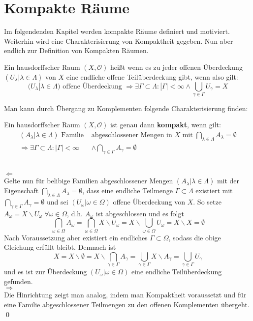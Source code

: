 \chapter{Kompakte Räume}
Im folgendenden Kapitel werden kompakte Räume definiert und motiviert. Weiterhin wird eine Charakterisierung von Kompaktheit gegeben.
Nun aber endlich zur Definition von Kompakten Räumen.

\begin{Def}[Kompaktheit]
	Ein hausdorffscher Raum \((X, \mathcal{O})\) heißt  wenn es zu jeder offenen Überdeckung 
	\((U_{\lambda} | \lambda \in \Lambda)\) von \(X\) eine endliche offene Teilüberdeckung gibt, wenn also gilt:
	\[ (U_{\lambda} | \lambda \in \Lambda) \mbox{ offene Überdeckung }
     \Rightarrow \exists \Gamma \subset \Lambda : |\Gamma| < \infty \land \bigcup_{\gamma \in \Gamma} U_{\gamma} = X \] 
\end{Def}
Man kann durch Übergang zu Komplementen folgende Charakterisierung finden:

\begin{Satz}
	Ein hausdorffscher Raum \((X, \mathcal{O})\) ist genau dann \textbf{kompakt}, wenn gilt:
	\begin{align*}
		(A_{\lambda}| \lambda \in \Lambda) \mbox{ Familie } & \mbox{abgeschlossener Mengen in } X \mbox{ mit } 
		\bigcap_{\lambda \in \Lambda} A_{\lambda} = \emptyset \\
		\Rightarrow \exists \Gamma \subset \Lambda : |\Gamma| < \infty & \land \bigcap_{\gamma \in \Gamma} A_{\gamma} = \emptyset
	\end{align*} 
\end{Satz}
	\\
	\glqq\(\Leftarrow\)\grqq
	\\
	Gelte nun für belibige Familien abgeschlossener Mengen \((A_{\lambda}| \lambda \in \Lambda)\) mit der Eigenschaft
	\(\bigcap_{\lambda \in \Lambda} A_{\lambda} = \emptyset\), dass eine endliche Teilmenge \(\Gamma \subset \Lambda\) existiert mit
	\(\bigcap_{\gamma \in \Gamma} A_{\gamma} = \emptyset\) und sei \( (U_{\omega} | \omega \in \Omega) \) offene Überdeckung
	von \(X\). So setze \(A_{\omega} = X \backslash U_{\omega} \; \forall \omega \in \Omega\), d.h. \(A_{\omega}\) ist abgeschlossen
	und es folgt 
	\[\bigcap_{\omega \in \Omega} A_{\omega} = \bigcap_{\omega \in \Omega} X \backslash U_{\omega} =  X \backslash 
	\bigcup_{\omega \in \Omega} U_{\omega} = X \backslash X =  \emptyset \]
	Nach Voraussetzung aber existiert ein endliches \(\Gamma \subset \Omega\), sodass die obige Gleichung erfüllt bleibt. Demnach ist 
	\[ X = X \backslash \emptyset = X \backslash \bigcap_{\gamma \in \Gamma} A_{\gamma} = \bigcup_{\gamma \in \Gamma} X \backslash A_{\gamma} = 
	\bigcup_{\gamma \in \Gamma} U_{\gamma} \] 
	und es ist zur Überdeckung \( (U_{\omega} | \omega \in \Omega) \) eine endliche Teilüberdeckung gefunden.
	\\
	\glqq\(\Rightarrow\)\grqq
	\\
	Die Hinrichtung zeigt man analog, indem man Kompaktheit voraussetzt und für eine Familie abgeschlossener Teilmengen zu den 
	offenen Komplementen übergeht.
\qed

